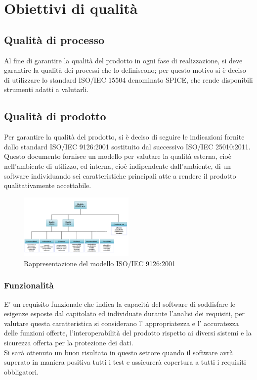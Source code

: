 \section{Obiettivi di qualità} 
\subsection{Qualità di processo}

Al fine di garantire la qualità del prodotto in ogni fase di realizzazione, si deve garantire la qualità dei processi che lo definiscono; per questo motivo si è deciso di utilizzare lo standard ISO/IEC 15504 denominato SPICE, che rende disponibili strumenti adatti a valutarli.

\subsection{Qualità di prodotto}
Per garantire la qualità del prodotto, si è deciso di seguire le indicazioni fornite dallo
standard ISO/IEC 9126:2001 sostituito dal successivo ISO/IEC 25010:2011. Questo
documento fornisce un modello per valutare la qualità esterna, cioè nell’ambiente
di utilizzo, ed interna, cioè indipendente dall’ambiente, di un software individuando
sei caratteristiche principali atte a rendere il prodotto qualitativamente accettabile.

\begin{figure}[h]
  \centering
    \includegraphics[width=0.5\textwidth]{./images/ISO-IEC_9126}
  \caption{Rappresentazione del modello ISO/IEC 9126:2001}
  \label{fig:ISO-IEC_9126}
\end{figure}


\subsubsection{Funzionalità}
E' un requisito funzionale che indica la capacità del software di soddisfare le esigenze esposte dal capitolato ed individuate durante l’analisi dei requisiti, per valutare questa caratteristica si considerano l' appropriatezza e l' accuratezza delle funzioni offerte, l'interoperabilità del prodotto rispetto ai diversi sistemi e la sicurezza offerta per la protezione dei dati.\\ 
Si sarà ottenuto un buon risultato in questo settore quando il software avrà superato in maniera positiva tutti i test e assicurerà copertura a tutti
i requisiti obbligatori.

